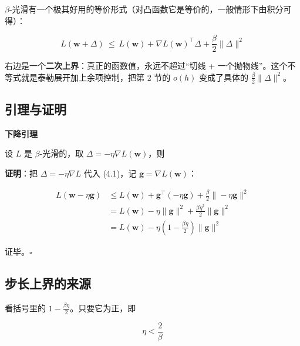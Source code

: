 \documentclass[UTF8, a4paper, zihao=-4, fontset=none]{ctexart}
\begin{document}
$\beta$-光滑有一个极其好用的等价形式（对凸函数它是等价的，一般情形下由积分可得）：


\begin{equation*}
L(\mathbf{w}+\Delta)\ \le\ L(\mathbf{w})+\nabla L(\mathbf{w})^\top\Delta+\frac{\beta}{2}\|\Delta\|^2 \tag{4.1}
\end{equation*}


右边是一个\textbf{二次上界}：真正的函数值，永远不超过“切线 + 一个抛物线”。这个不等式就是泰勒展开加上余项控制，把第 2 节的 $o(h)$ 变成了具体的 $\frac{\beta}{2}\|\Delta\|^2$。




\subsection{引理与证明}



\begin{goodbox}
{\bfseries\sffamily\small\color{good} 下降引理}\par\vspace{2pt}
设 $L$ 是 $\beta$-光滑的，取 $\Delta=-\eta\nabla L(\mathbf{w})$，则


\end{goodbox}



\textbf{证明}：把 $\Delta=-\eta\nabla L$ 代入 (4.1)，记 $\mathbf{g}=\nabla L(\mathbf{w})$：


\[
\begin{aligned}
L(\mathbf{w}-\eta\mathbf{g})
&\le L(\mathbf{w})+\mathbf{g}^\top(-\eta\mathbf{g})+\frac{\beta}{2}\|-\eta\mathbf{g}\|^2\\[4pt]
&=L(\mathbf{w})-\eta\|\mathbf{g}\|^2+\frac{\beta\eta^2}{2}\|\mathbf{g}\|^2\\[4pt]
&=L(\mathbf{w})-\eta\left(1-\frac{\beta\eta}{2}\right)\|\mathbf{g}\|^2
\end{aligned}
\]


证毕。$\square$




\subsection{步长上界的来源}



看括号里的 $1-\frac{\beta\eta}{2}$。只要它为正，即


\[
\eta<\frac{2}{\beta}
\]
\end{document}
